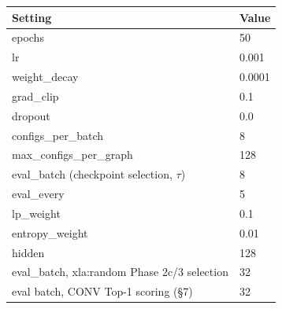 \begin{tabular}{ll}
\toprule
Setting & Value \\
\midrule
epochs & 50 \\
lr & 0.001 \\
weight\_decay & 0.0001 \\
grad\_clip & 0.1 \\
dropout & 0.0 \\
configs\_per\_batch & 8 \\
max\_configs\_per\_graph & 128 \\
eval\_batch (checkpoint selection, $\tau$) & 8 \\
eval\_every & 5 \\
lp\_weight & 0.1 \\
entropy\_weight & 0.01 \\
hidden & 128 \\
\midrule
eval\_batch, xla:random Phase 2c/3 selection & 32 \\
eval batch, CONV Top-1 scoring (\S7) & 32 \\
\bottomrule
\end{tabular}
